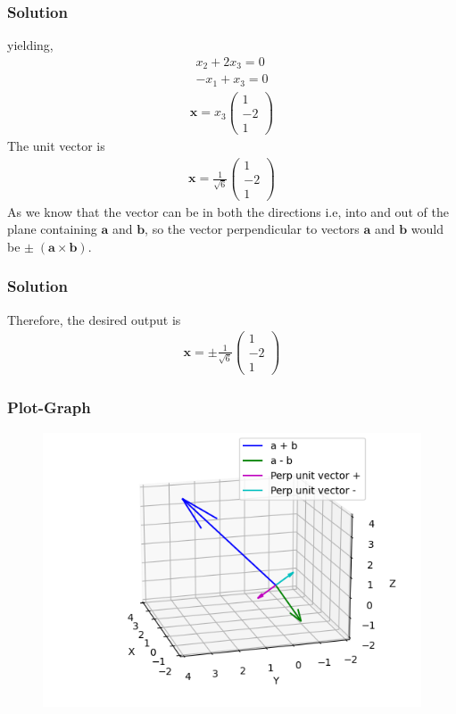 \documentclass{beamer}
\theoremstyle{remark}
\newcommand{\myvec}[1]{\ensuremath{\begin{pmatrix}#1\end{pmatrix}}}
\let\vec\mathbf
\numberwithin{equation}{section}
\begin{document}
\begin{frame}
\frametitle{Solution}
yielding,
\begin{align}
    x_2+2x_3=0\\
    -x_1+x_3=0
\end{align}
\begin{align}
    \vec{x}=x_3\myvec{1\\-2\\1}
\end{align}
The unit vector is 
\begin{align}
      \vec{x}=\frac{1}{\sqrt{6}}\myvec{1\\-2\\1}
\end{align}
As we know that the vector can be in both the directions i.e, into and out of the plane containing $\vec{a}$ and $\vec{b}$, so the vector perpendicular to vectors $\vec{a}$ and $\vec{b}$ would be $\pm\;(\vec{a} \times \vec{b})$.

\end{frame}
\begin{frame}
\frametitle{Solution}
Therefore, the desired output is
\begin{align}
    \vec{x}=\pm\frac{1}{\sqrt{6}}\myvec{1\\-2\\1}
\end{align}
\end{frame}

\begin{frame}[fragile]
\frametitle{Plot-Graph}

\begin{figure}[h!]
   \centering
   \includegraphics[width=0.7\columnwidth]{figs/fig.png}
	\caption{}
   \label{stemplot}
\end{figure}
\end{frame}
\end{document}
